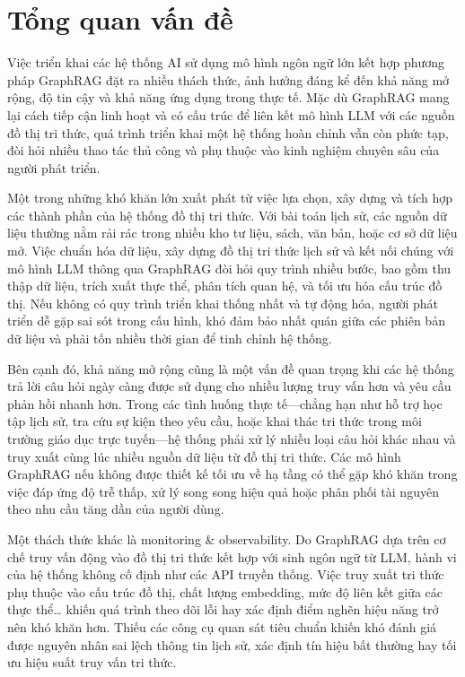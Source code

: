 \section{Tổng quan vấn đề}
Việc triển khai các hệ thống AI sử dụng mô hình ngôn ngữ lớn kết hợp phương pháp GraphRAG đặt ra nhiều thách thức, ảnh hưởng đáng kể đến khả năng mở rộng, độ tin cậy và khả năng ứng dụng trong thực tế. Mặc dù GraphRAG mang lại cách tiếp cận linh hoạt và có cấu trúc để liên kết mô hình LLM với các nguồn đồ thị tri thức, quá trình triển khai một hệ thống hoàn chỉnh vẫn còn phức tạp, đòi hỏi nhiều thao tác thủ công và phụ thuộc vào kinh nghiệm chuyên sâu của người phát triển.

Một trong những khó khăn lớn xuất phát từ việc lựa chọn, xây dựng và tích hợp các thành phần của hệ thống đồ thị tri thức. Với bài toán lịch sử, các nguồn dữ liệu thường nằm rải rác trong nhiều kho tư liệu, sách, văn bản, hoặc cơ sở dữ liệu mở. Việc chuẩn hóa dữ liệu, xây dựng đồ thị tri thức lịch sử và kết nối chúng với mô hình LLM thông qua GraphRAG đòi hỏi quy trình nhiều bước, bao gồm thu thập dữ liệu, trích xuất thực thể, phân tích quan hệ, và tối ưu hóa cấu trúc đồ thị. Nếu không có quy trình triển khai thống nhất và tự động hóa, người phát triển dễ gặp sai sót trong cấu hình, khó đảm bảo nhất quán giữa các phiên bản dữ liệu và phải tốn nhiều thời gian để tinh chỉnh hệ thống.

Bên cạnh đó, khả năng mở rộng cũng là một vấn đề quan trọng khi các hệ thống trả lời câu hỏi ngày càng được sử dụng cho nhiều lượng truy vấn hơn và yêu cầu phản hồi nhanh hơn. Trong các tình huống thực tế—chẳng hạn như hỗ trợ học tập lịch sử, tra cứu sự kiện theo yêu cầu, hoặc khai thác tri thức trong môi trường giáo dục trực tuyến—hệ thống phải xử lý nhiều loại câu hỏi khác nhau và truy xuất cùng lúc nhiều nguồn dữ liệu từ đồ thị tri thức. Các mô hình GraphRAG nếu không được thiết kế tối ưu về hạ tầng có thể gặp khó khăn trong việc đáp ứng độ trễ thấp, xử lý song song hiệu quả hoặc phân phối tài nguyên theo nhu cầu tăng dần của người dùng.

Một thách thức khác là monitoring \& observability. Do GraphRAG dựa trên cơ chế truy vấn động vào đồ thị tri thức kết hợp với sinh ngôn ngữ từ LLM, hành vi của hệ thống không cố định như các API truyền thống. Việc truy xuất tri thức phụ thuộc vào cấu trúc đồ thị, chất lượng embedding, mức độ liên kết giữa các thực thể… khiến quá trình theo dõi lỗi hay xác định điểm nghẽn hiệu năng trở nên khó khăn hơn. Thiếu các công cụ quan sát tiêu chuẩn khiến khó đánh giá được nguyên nhân sai lệch thông tin lịch sử, xác định tín hiệu bất thường hay tối ưu hiệu suất truy vấn tri thức.

